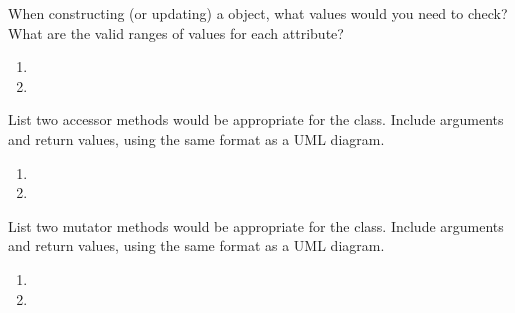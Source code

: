 \Q When constructing (or updating) a  object, what values would you need to check? What are the valid ranges of values for each attribute?

\begin{enumerate}
\item 
\item 
\end{enumerate}


\Q List two accessor methods would be appropriate for the  class.
Include arguments and return values, using the same format as a UML diagram.

\begin{enumerate}
\item 
\item 
\end{enumerate}


\Q List two mutator methods would be appropriate for the  class.
Include arguments and return values, using the same format as a UML diagram.

\begin{enumerate}
\item 
\item 
\end{enumerate}

